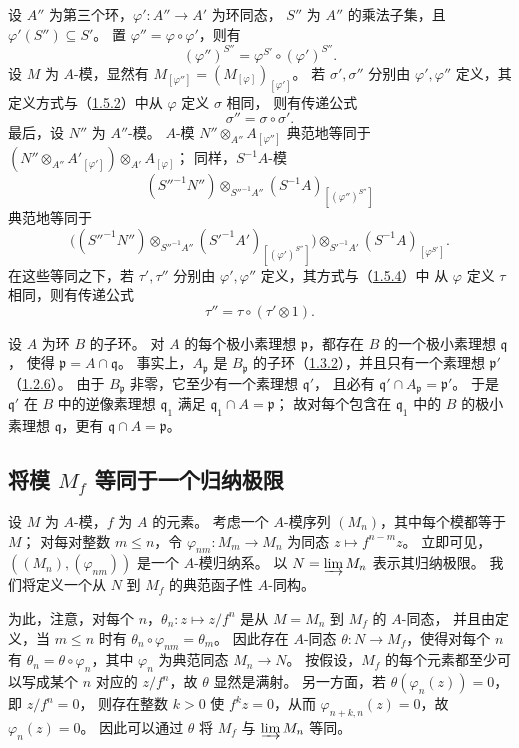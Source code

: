 设 $A''$ 为第三个环，$\varphi'\colon A''\to A'$ 为环同态，
$S''$ 为 $A''$ 的乘法子集，且 $\varphi'(S'')\subseteq S'$。
置 $\varphi''=\varphi\circ\varphi'$，则有
\[
 (\varphi'')^{S''}=\varphi^{S'}\circ(\varphi')^{S''}.
\]
设 $M$ 为 $A$-模，显然有 $M_{[\varphi'']}=(M_{[\varphi]})_{[\varphi']}$。
若 $\sigma',\sigma''$ 分别由 $\varphi',\varphi''$ 定义，其定义方式与（\hyperlink{para:0:1.5.2}{1.5.2}）中从 $\varphi$ 定义 $\sigma$ 相同，
则有传递公式
\[
 \sigma''=\sigma\circ\sigma'.
\]
最后，设 $N''$ 为 $A''$-模。
$A$-模 $N''\otimes_{A''}A_{[\varphi'']}$ 典范地等同于
$(N''\otimes_{A''}A'_{[\varphi']})\otimes_{A'}A_{[\varphi]}$；
同样，$S^{-1}A$-模
\[
 (S''^{-1}N'')\otimes_{S''^{-1}A''}(S^{-1}A)_{[(\varphi'')^{S''}]}
\]
典范地等同于
\[
 \bigl((S''^{-1}N'')\otimes_{S''^{-1}A''}
       (S'^{-1}A')_{[(\varphi')^{S''}]}\bigr)
       \otimes_{S'^{-1}A'}(S^{-1}A)_{[\varphi^{S'}]}.
\]
在这些等同之下，若 $\tau',\tau''$ 分别由 $\varphi',\varphi''$ 定义，其方式与（\hyperlink{para:0:1.5.4}{1.5.4}）中
从 $\varphi$ 定义 $\tau$ 相同，则有传递公式
\[
 \tau''=\tau\circ(\tau'\otimes1).
\]

设 $A$ 为环 $B$ 的子环。
对 $A$ 的每个极小素理想 $\mathfrak p$，都存在 $B$ 的一个极小素理想 $\mathfrak q$，
使得 $\mathfrak p=A\cap\mathfrak q$。
事实上，$A_{\mathfrak p}$ 是 $B_{\mathfrak p}$ 的子环（\hyperlink{para:0:1.3.2}{1.3.2}），并且只有一个素理想
$\mathfrak p'$（\hyperlink{para:0:1.2.6}{1.2.6}）。
由于 $B_{\mathfrak p}$ 非零，它至少有一个素理想 $\mathfrak q'$，
且必有 $\mathfrak q'\cap A_{\mathfrak p}=\mathfrak p'$。
于是 $\mathfrak q'$ 在 $B$ 中的逆像素理想 $\mathfrak q_1$ 满足
$\mathfrak q_1\cap A=\mathfrak p$；
故对每个包含在 $\mathfrak q_1$ 中的 $B$ 的极小素理想 $\mathfrak q$，更有
$\mathfrak q\cap A=\mathfrak p$。

\subsection{将模 \texorpdfstring{$M_f$}{Mf} 等同于一个归纳极限}\hypertarget{heading:0:1.6}{}

设 $M$ 为 $A$-模，$f$ 为 $A$ 的元素。
考虑一个 $A$-模序列 $(M_n)$，其中每个模都等于 $M$；
对每对整数 $m\le n$，令 $\varphi_{nm}\colon M_m\to M_n$ 为同态
$z\mapsto f^{n-m}z$。
立即可见，$((M_n),(\varphi_{nm}))$ 是一个 $A$-模归纳系。
以 $N=\varinjlim M_n$ 表示其归纳极限。
我们将定义一个从 $N$ 到 $M_f$ 的典范函子性 $A$-同构。

为此，注意，对每个 $n$，$\theta_n\colon z\mapsto z/f^n$ 是从 $M=M_n$ 到 $M_f$ 的 $A$-同态，
并且由定义，当 $m\le n$ 时有 $\theta_n\circ\varphi_{nm}=\theta_m$。
因此存在 $A$-同态 $\theta\colon N\to M_f$，使得对每个 $n$ 有
$\theta_n=\theta\circ\varphi_n$，其中 $\varphi_n$ 为典范同态 $M_n\to N$。
按假设，$M_f$ 的每个元素都至少可以写成某个 $n$ 对应的 $z/f^n$，故 $\theta$ 显然是满射。
另一方面，若 $\theta(\varphi_n(z))=0$，即 $z/f^n=0$，
则存在整数 $k>0$ 使 $f^kz=0$，从而 $\varphi_{n+k,n}(z)=0$，故 $\varphi_n(z)=0$。
因此可以通过 $\theta$ 将 $M_f$ 与 $\varinjlim M_n$ 等同。

